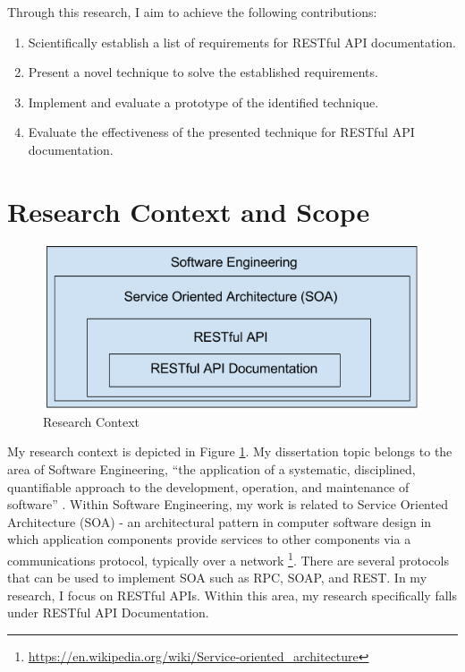 \documentclass[11pt,oneside]{book}
\begin{document}
Through this research, I aim to achieve the following contributions:
\begin{enumerate}
  \item Scientifically establish a list of requirements for RESTful API documentation.
  \item Present a novel technique to solve the established requirements.
  \item Implement and evaluate a prototype of the identified technique.
  \item Evaluate the effectiveness of the presented technique for RESTful API documentation.
\end{enumerate}

\section{Research Context and Scope}

\begin{figure}[bth]
  \includegraphics[width=\linewidth]{context.png}
  \caption{Research Context}
  \label{fig:context}
\end{figure}

My research context is depicted in Figure \ref{fig:context}. My dissertation topic belongs to the area of Software Engineering, “the application of a systematic, disciplined, quantifiable approach to the development, operation, and maintenance of software” \cite{iee_std}. Within Software Engineering, my work is related to Service Oriented Architecture (SOA) -  an architectural pattern in computer software design in which application components provide services to other components via a communications protocol, typically over a network \footnote{\url{https://en.wikipedia.org/wiki/Service-oriented_architecture}}. There are several protocols that can be used to implement SOA such as RPC, SOAP, and REST. In my research, I focus on RESTful APIs. Within this area, my research specifically falls under RESTful API Documentation.
\end{document}
